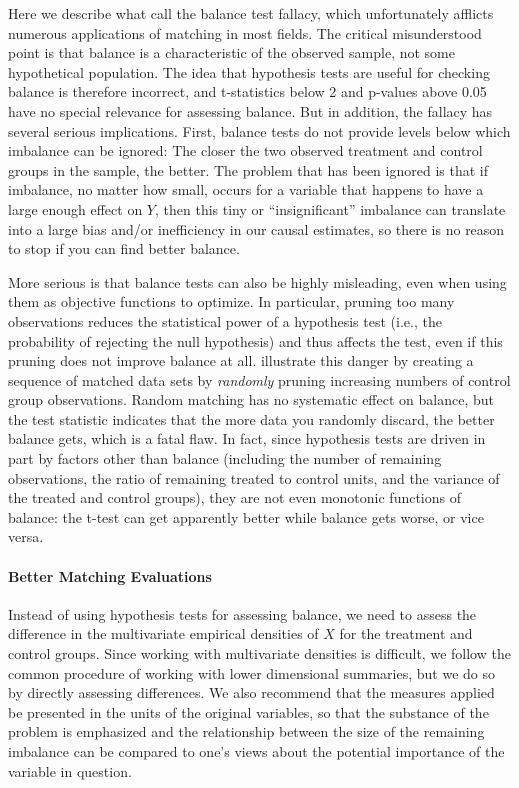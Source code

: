 \documentclass[11pt,titlepage]{article}
\begin{document}
Here we describe what \citet{ImaKinStu06} call the balance test
fallacy, which unfortunately afflicts numerous applications of
matching in most fields.  The critical misunderstood point is that
balance is a characteristic of the observed sample, not some
hypothetical population.  The idea that hypothesis tests are useful
for checking balance is therefore incorrect, and t-statistics below 2
and p-values above 0.05 have no special relevance for assessing
balance.  But in addition, the fallacy has several serious
implications.  First, balance tests do not provide levels below which
imbalance can be ignored: The closer the two observed treatment and
control groups in the sample, the better.  The problem that has been
ignored is that if imbalance, no matter how small, occurs for a
variable that happens to have a large enough effect on $Y$, then this
tiny or ``insignificant'' imbalance can translate into a large bias
and/or inefficiency in our causal estimates, so there is no reason to
stop if you can find better balance.

More serious is that balance tests can also be highly misleading, even
when using them as objective functions to optimize.  In particular,
pruning too many observations reduces the statistical power of a
hypothesis test (i.e., the probability of rejecting the null
hypothesis) and thus affects the test, even if this pruning does not
improve balance at all.  \citet{ImaKinStu06} illustrate this danger by
creating a sequence of matched data sets by \emph{randomly} pruning
increasing numbers of control group observations.  Random matching has
no systematic effect on balance, but the test statistic indicates that
the more data you randomly discard, the better balance gets, which is
a fatal flaw.  In fact, since hypothesis tests are driven in part by
factors other than balance (including the number of remaining
observations, the ratio of remaining treated to control units, and the
variance of the treated and control groups), they are not even
monotonic functions of balance: the t-test can get apparently better
while balance gets worse, or vice versa.

\paragraph{Better Matching Evaluations}

Instead of using hypothesis tests for assessing balance, we need to
assess the difference in the multivariate empirical densities of $X$
for the treatment and control groups.  Since working with multivariate
densities is difficult, we follow the common procedure of working with
lower dimensional summaries, but we do so by directly assessing
differences.  We also recommend that the measures applied be presented
in the units of the original variables, so that the substance of the
problem is emphasized and the relationship between the size of the
remaining imbalance can be compared to one's views about the potential
importance of the variable in question.
\end{document}
